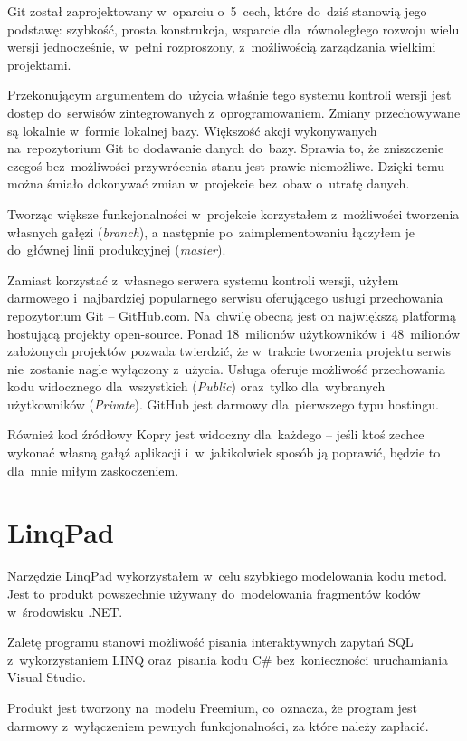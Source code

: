 \documentclass[a4paper,twoside,titlepage,openright]{book}
\begin{document}
Git został zaprojektowany w~oparciu o~5~cech, które do~dziś stanowią jego podstawę: szybkość, prosta konstrukcja, wsparcie dla~równoległego rozwoju wielu wersji jednocześnie, w~pełni rozproszony, z~możliwością zarządzania wielkimi projektami.\cite{git}

Przekonującym argumentem do~użycia właśnie tego systemu kontroli wersji jest dostęp do~serwisów zintegrowanych z~oprogramowaniem. Zmiany przechowywane są lokalnie w~formie lokalnej bazy. Większość akcji wykonywanych na~repozytorium Git to dodawanie danych do~bazy. Sprawia to, że zniszczenie czegoś bez~możliwości przywrócenia stanu jest prawie niemożliwe. Dzięki temu można śmiało dokonywać zmian w~projekcie bez~obaw o~utratę danych. 

Tworząc większe funkcjonalności w~projekcie korzystałem z~możliwości tworzenia własnych gałęzi (\textit{branch}), a następnie po~zaimplementowaniu łączyłem je do~głównej linii produkcyjnej (\textit{master}).

Zamiast korzystać z~własnego serwera systemu kontroli wersji, użyłem darmowego i~najbardziej popularnego serwisu oferującego usługi przechowania repozytorium Git -- GitHub.com. Na~chwilę obecną jest on największą platformą hostującą projekty open-source. Ponad 18~milionów użytkowników i~48~milionów założonych projektów pozwala twierdzić, że w~trakcie tworzenia projektu serwis nie~zostanie nagle wyłączony z~użycia. Usługa oferuje możliwość przechowania kodu widocznego dla~wszystkich (\textit{Public}) oraz~tylko dla~wybranych użytkowników (\textit{Private}). GitHub jest darmowy dla~pierwszego typu hostingu.\cite{gutHubCennik} 

Również kod źródłowy Kopry jest widoczny dla~każdego -- jeśli ktoś zechce wykonać własną gałąź aplikacji i~w~jakikolwiek sposób ją poprawić, będzie to dla~mnie miłym zaskoczeniem.


\section{LinqPad}
Narzędzie LinqPad wykorzystałem w~celu szybkiego modelowania kodu metod. Jest to produkt powszechnie używany do~modelowania fragmentów kodów w~środowisku .NET. 

Zaletę programu stanowi możliwość pisania interaktywnych zapytań SQL z~wykorzystaniem LINQ oraz~pisania kodu C\# bez~konieczności uruchamiania Visual Studio.\cite{linqPad} 

Produkt jest tworzony na~modelu Freemium, co~oznacza, że program jest darmowy z~wyłączeniem pewnych funkcjonalności, za które należy zapłacić.\cite{linqPadWiki}
\end{document}
